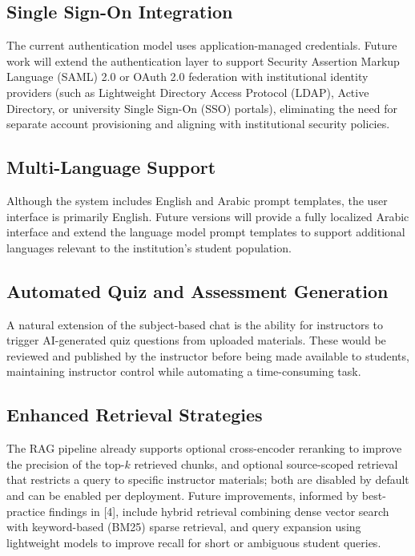 \documentclass[12pt, a4paper, oneside]{report}
\let\oldsubsection\subsection
\renewcommand{\subsection}{%
  \addtocontents{toc}{\protect\needspace{3\baselineskip}}%
  \oldsubsection
}
\begin{document}
\subsection{Single Sign-On Integration}

The current authentication model uses application-managed credentials. Future work will extend the authentication layer to support Security Assertion Markup Language (SAML) 2.0 or OAuth 2.0 federation with institutional identity providers (such as Lightweight Directory Access Protocol (LDAP), Active Directory, or university Single Sign-On (SSO) portals), eliminating the need for separate account provisioning and aligning with institutional security policies.

\subsection{Multi-Language Support}

Although the system includes English and Arabic prompt templates, the user interface is primarily English. Future versions will provide a fully localized Arabic interface and extend the language model prompt templates to support additional languages relevant to the institution's student population.

\subsection{Automated Quiz and Assessment Generation}

A natural extension of the subject-based chat is the ability for instructors to trigger AI-generated quiz questions from uploaded materials. These would be reviewed and published by the instructor before being made available to students, maintaining instructor control while automating a time-consuming task.
\newpage
\subsection{Enhanced Retrieval Strategies}

The RAG pipeline already supports optional cross-encoder reranking to improve the precision of the top-$k$ retrieved chunks, and optional source-scoped retrieval that restricts a query to specific instructor materials; both are disabled by default and can be enabled per deployment. Future improvements, informed by best-practice findings in [4], include hybrid retrieval combining dense vector search with keyword-based (BM25) sparse retrieval, and query expansion using lightweight models to improve recall for short or ambiguous student queries.
\end{document}
